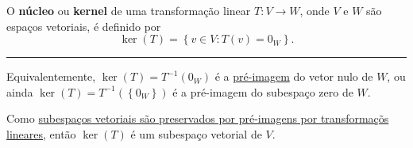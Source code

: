 \begin{definition}
	O \textbf{núcleo} ou \textbf{kernel} de uma transformação linear $T\colon V\to W$, onde $V$ e $W$ são espaços vetoriais, é definido por
	\[\ker(T)=\left\{v\in V:T(v)=0_W\right\}.\]
	
	\hrule
	
	Equivalentemente, $\ker(T)=T^{-1}(0_W)$ é a \href{http://mtm.ufsc.br/~cordeiro/ensino/mtm3112.algebra.linear/10.nucleo.imagem/rev_im_preim_moodle.html}{pré-imagem} do vetor nulo de $W$, ou ainda $\ker(T)=T^{-1}(\left\{0_W\right\})$ é a pré-imagem do subespaço zero de $W$.
	
	Como \href{http://mtm.ufsc.br/~cordeiro/ensino/mtm3112.algebra.linear/10.nucleo.imagem/teo_im_inv_subesp_trans_lin_moodle.html}{subespaços vetoriais são preservados por pré-imagens por transformaçõs lineares}, então $\ker(T)$ é um subespaço vetorial de $V$.
\end{definition}